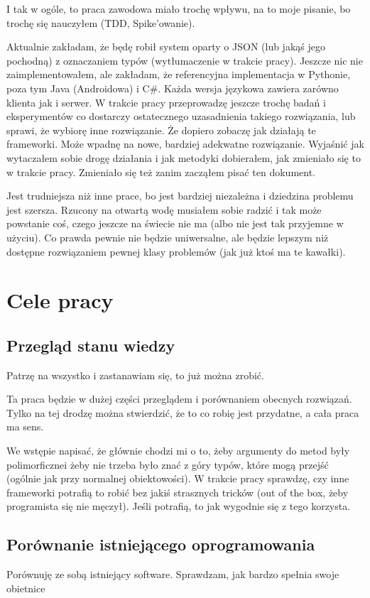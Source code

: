 I tak w ogóle, to praca zawodowa miało trochę wpływu, na to moje pisanie, bo trochę się nauczyłem (TDD, Spike'owanie).

Aktualnie zakładam, że będę robił system oparty o JSON (lub jakąś jego pochodną) z oznaczaniem typów (wytłumaczenie w trakcie pracy). Jeszcze nic nie zaimplementowałem, ale zakładam, że referencyjna implementacja w Pythonie, poza tym Java (Androidowa) i C\#. Każda wersja językowa zawiera zarówno klienta jak i serwer. W trakcie pracy przeprowadzę jeszcze trochę badań i eksperymentów co dostarczy ostatecznego uzasadnienia takiego rozwiązania, lub sprawi, że wybiorę inne rozwiązanie. Że dopiero zobaczę jak działają te frameworki. Może wpadnę na nowe, bardziej adekwatne rozwiązanie. Wyjaśnić jak wytaczałem sobie drogę działania i jak metodyki dobierałem, jak zmieniało się to w trakcie pracy. Zmieniało się też zanim zacząłem pisać ten dokument.

Jest trudniejsza niż inne prace, bo jest bardziej niezależna i dziedzina problemu jest szersza. Rzucony na otwartą wodę musiałem sobie radzić i tak może powstanie coś, czego jeszcze na świecie nie ma (albo nie jest tak przyjemne w użyciu). Co prawda pewnie nie będzie uniwersalne, ale będzie lepszym niż dostępne rozwiązaniem pewnej klasy problemów (jak już ktoś ma te kawałki).

\section{Cele pracy}
\subsection{Przegląd stanu wiedzy}
Patrzę na wszystko i zastanawiam się, to już można zrobić.

Ta praca będzie w dużej części przeglądem i porównaniem obecnych rozwiązań. Tylko na tej drodzę można stwierdzić, że to co robię jest przydatne, a cała praca ma sens.

We wstępie napisać, że głównie chodzi mi o to, żeby argumenty do metod były polimorficznei żeby nie trzeba było znać z góry typów, które mogą przejść (ogólnie jak przy normalnej obiektowości). W trakcie pracy sprawdzę, czy inne frameworki potrafią to robić bez jakiś strasznych tricków (out of the box, żeby programista się nie męczył). Jeśli potrafią, to jak wygodnie się z tego korzysta.

\subsection{Porównanie istniejącego oprogramowania}
Porównuję ze sobą istniejący software. Sprawdzam, jak bardzo spełnia swoje obietnice

